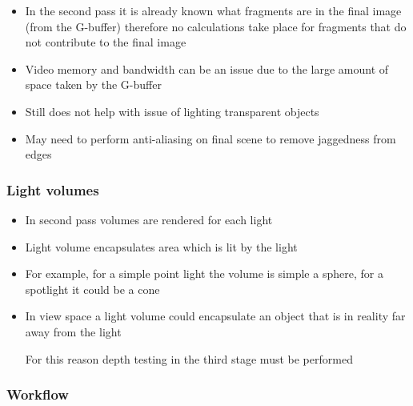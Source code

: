 \documentclass[a4paper]{article}
\begin{document}
\begin{itemize}
  \item
    In the second pass it is already known what fragments are in the final image
    (from the G-buffer) therefore no calculations take place for fragments that
    do not contribute to the final image

  \item
    Video memory and bandwidth can be an issue due to the large amount of space
    taken by the G-buffer

  \item
    Still does not help with issue of lighting transparent objects

  \item
    May need to perform anti-aliasing on final scene to remove jaggedness from
    edges

\end{itemize}

\subsubsection{Light volumes}

\begin{itemize}
  \item
    In second pass volumes are rendered for each light

  \item
    Light volume encapsulates area which is lit by the light

  \item
    For example, for a simple point light the volume is simple a sphere, for a
    spotlight it could be a cone

  \item
    In view space a light volume could encapsulate an object that is in reality
    far away from the light

    For this reason depth testing in the third stage must be performed

\end{itemize}

\subsubsection{Workflow}
\end{document}
